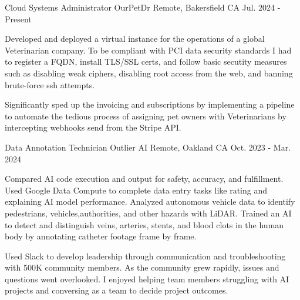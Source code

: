 

\begin{cventries}

	\cventry
	{Cloud Systems Administrator} %
	{OurPetDr} %
	{Remote, Bakersfield CA} %
	{Jul. 2024 - Present} %
	{
		\begin{cvitems} %
		\item {Developed and deployed a virtual instance for the operations of a global Veterinarian company. To be compliant with PCI data security standards I had to register a FQDN, install TLS/SSL certs, and follow basic secutity measures such as disabling weak ciphers, disabling root access from the web, and banning brute-force ssh attempts. }
		\item {Significantly sped up the invoicing and subscriptions by implementing a pipeline to automate the tedious process of assigning pet owners with Veterinarians by intercepting webhooks send from the Stripe API.}
		\end{cvitems}
	}

	\cventry
	{Data Annotation Technician} %
	{Outlier AI} %
	{Remote, Oakland CA} %
	{Oct. 2023 - Mar. 2024} %
	{
		\begin{cvitems} %
		\item {Compared AI code execution and output for safety, accuracy, and fulfillment. Used Google Data Compute to complete data entry tasks like rating and explaining AI model performance. Analyzed autonomous vehicle data to identify pedestrians, vehicles,authorities, and other hazards with LiDAR. Trained an AI to detect and distinguish veins, arteries, stents, and blood clots in the human body by annotating catheter footage frame by frame.}
		\item {Used Slack to develop leadership through communication and troubleshooting with 500K community members. As the community grew rapidly, issues and questions went overlooked. I enjoyed helping team members struggling with AI projects and conversing as a team to decide project outcomes.}
		\end{cvitems}
	}


\end{cventries}
